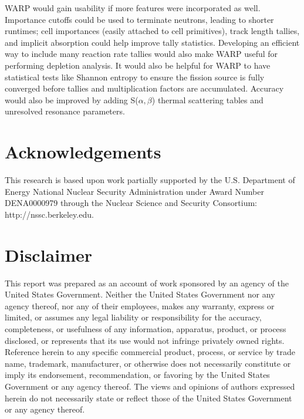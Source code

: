 \documentclass[preprint,12pt]{elsarticle}
\begin{document}
WARP would gain usability if more features were incorporated as well.  Importance cutoffs could be used to terminate neutrons, leading to shorter runtimes; cell importances (easily attached to cell primitives), track length tallies, and implicit absorption could help improve tally statistics.  Developing an efficient way to include many reaction rate tallies would also make WARP useful for performing depletion analysis.  It would also be helpful for WARP to have statistical tests like Shannon entropy to ensure the fission source is fully converged before tallies and multiplication factors are accumulated.  Accuracy would also be improved by adding S($\alpha,$$\beta$) thermal scattering tables and unresolved resonance parameters.


\section*{Acknowledgements}
\label{sec:ack}

This research is based upon work partially supported by the U.S. Department of Energy National Nuclear Security Administration under Award Number DENA0000979 through the Nuclear Science and Security Consortium: http://nssc.berkeley.edu.

\section*{Disclaimer}
\label{sec:disc}

This report was prepared as an account of work sponsored by an agency of the United States Government. Neither the United States Government nor any agency thereof, nor any of their employees, makes any warranty, express or limited, or assumes any legal liability or responsibility for the accuracy, completeness, or usefulness of any information, apparatus, product, or process disclosed, or represents that its use would not infringe privately owned rights. Reference herein to any specific commercial product, process, or service by trade name, trademark, manufacturer, or otherwise does not necessarily constitute or imply its endorsement, recommendation, or favoring by the United States Government or any agency thereof. The views and opinions of authors expressed herein do not necessarily state or reflect those of the United States Government or any agency thereof.



\end{document}
